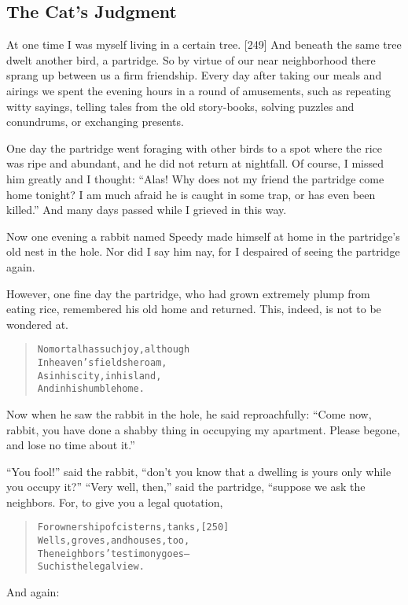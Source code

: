 \documentclass[article, twoside, 14pt]{memoir}
\renewenvironment{verbatim}{%
\begin{quote}%
\vskip -10pt%
\begin{alltt}\normalfont\large}{\end{alltt}%
\end{quote}%
\vskip -10pt
} %
\begin{document}
\subsection{The Cat's Judgment}

\label{s50}

At one time I was myself living in a certain tree. [249] And
beneath the same tree dwelt another bird, a partridge. So by virtue
of our near neighborhood there sprang up between us a firm
friendship. Every day after taking our meals and airings we spent
the evening hours in a round of amusements, such as repeating witty
sayings, telling tales from the old story-books, solving puzzles
and conundrums, or exchanging presents.

One day the partridge went foraging with other birds to a spot
where the rice was ripe and abundant, and he did not return at
nightfall. Of course, I missed him greatly and I thought:
``Alas! Why does not my friend the partridge come home tonight? I am much afraid he is caught in some trap, or has even been killed.''
And many days passed while I grieved in this way.

Now one evening a rabbit named Speedy made himself at home in the
partridge's old nest in the hole. Nor did I say him nay, for I
despaired of seeing the partridge again.

However, one fine day the partridge, who had grown extremely plump
from eating rice, remembered his old home and returned. This,
indeed, is not to be wondered at.

\begin{verbatim}
No mortal has such joy, although
    In heaven's fields he roam,
As in his city, in his land,
    And in his humble home.
\end{verbatim}
Now when he saw the rabbit in the hole, he said reproachfully:
``Come now, rabbit, you have done a shabby thing in occupying my apartment. Please begone, and lose no time about it.''

``You fool!'' said the rabbit,
``don't you know that a dwelling is yours only while you occupy it?''
``Very well, then,'' said the partridge, “suppose we ask the
neighbors. For, to give you a legal quotation,

\begin{verbatim}
For ownership of cisterns, tanks,                       [250]
    Wells, groves, and houses, too,
The neighbors' testimony goes--
    Such is the legal view.
\end{verbatim}
And again:
\end{document}
